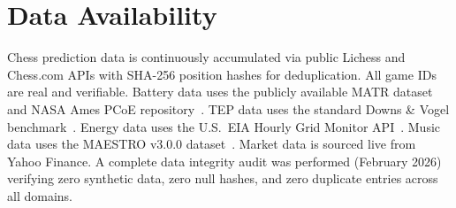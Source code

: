 \documentclass[11pt,a4paper]{article}
\begin{document}
\section{Data Availability}

Chess prediction data is continuously accumulated via public Lichess and Chess.com
APIs with SHA-256 position hashes for deduplication. All game IDs are real and
verifiable. Battery data uses the publicly available MATR dataset~\citep{severson2019}
and NASA Ames PCoE repository~\citep{saha2007}. TEP data uses the standard Downs \&
Vogel benchmark~\citep{downs1993}. Energy data uses the U.S.\ EIA Hourly Grid Monitor
API~\citep{hong2016}. Music data uses the MAESTRO v3.0.0 dataset~\citep{maestro2019}.
Market data is sourced live from Yahoo Finance. A complete data integrity audit was
performed (February 2026) verifying zero synthetic data, zero null hashes, and zero
duplicate entries across all domains.


\end{document}
